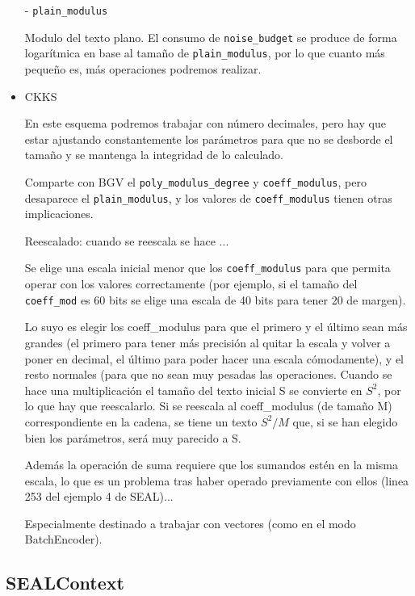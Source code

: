 \begin{itemize}
  - \verb|plain_modulus|

  Modulo del texto plano. El consumo de \verb|noise_budget| se produce de forma logarítmica en base al tamaño de \verb|plain_modulus|, por lo que cuanto más pequeño es, más operaciones podremos realizar.

  \item CKKS

  En este esquema podremos trabajar con número decimales, pero hay que estar ajustando constantemente los parámetros para que no se desborde el tamaño y se mantenga la integridad de lo calculado.

  Comparte con BGV el \verb|poly_modulus_degree| y \verb|coeff_modulus|, pero desaparece el \verb|plain_modulus|, y los valores de \verb|coeff_modulus| tienen otras implicaciones.

  Reescalado: cuando se reescala se hace ...

  Se elige una escala inicial menor que los \verb|coeff_modulus| para que permita operar con los valores correctamente (por ejemplo, si el tamaño del \verb|coeff_mod| es 60 bits se elige una escala de 40 bits para tener 20 de margen).

  Lo suyo es elegir los coeff\_modulus para que el primero y el último sean más grandes (el primero para tener más precisión al quitar la escala y volver a poner en decimal, el último para poder hacer una escala cómodamente), y el resto normales (para que no sean muy pesadas las operaciones. Cuando se hace una multiplicación el tamaño del texto inicial S se convierte en $S^2$, por lo que hay que reescalarlo. Si se reescala al coeff\_modulus (de tamaño M) correspondiente en la cadena, se tiene un texto $S^2/M$ que, si se han elegido bien los parámetros, será muy parecido a S.

  Además la operación de suma requiere que los sumandos estén en la misma escala, lo que es un problema tras haber operado previamente con ellos (linea 253 del ejemplo 4 de SEAL)...

  Especialmente destinado a trabajar con vectores (como en el modo BatchEncoder).

\end{itemize}

\subsection{SEALContext}


